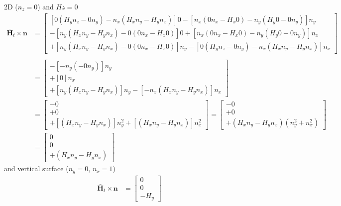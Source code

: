 \documentclass{article}
\newcommand{\Hb}{\mathbf{\bar H}}
\newcommand{\n}{\mathbf{n}}
\newcommand{\0}{\varnothing}
\begin{document}
2D ($n_z = 0$) and $Hz = 0$ 
\begin{align*}
    \Hb_t \times \n &=  \left[
    \begin{array}{c}
    [0 (H_y n_z - 0 n_y) - n_x (H_x n_y - H_y n_x)] 0 - [n_x (0 n_x - H_x 0) - n_y (H_y 0 - 0 n_y)] n_y\\
    -[n_y (H_x n_y - H_y n_x) - 0 (0 n_x - H_x 0)] 0 + [n_x (0 n_x - H_x 0) - n_y (H_y 0 - 0 n_y)]n_x\\
    +[n_y (H_x n_y - H_y n_x) - 0 (0 n_x - H_x 0)] n_y - [0 (H_y n_z - 0 n_y) - n_x (H_x n_y - H_y n_x)]n_x
    \end{array} \right]\\\\
    &=  \left[
    \begin{array}{c}
     - [ - n_y ( - 0 n_y)] n_y\\
     + [0] n_x\\
    +[n_y (H_x n_y - H_y n_x)] n_y - [ - n_x (H_x n_y - H_y n_x)]n_x
    \end{array} \right]\\    
    &=  \left[
    \begin{array}{c}
     - 0\\
     + 0\\
    +[(H_x n_y - H_y n_x)] n^2_y + [(H_x n_y - H_y n_x)]n^2_x
    \end{array} \right] = \left[
    \begin{array}{c}
     - 0\\
     + 0\\
    +(H_x n_y - H_y n_x)(n^2_y+ n^2_x)
    \end{array} \right]\\
    &=  \left[
    \begin{array}{c}
     0\\
     0\\
    +(H_x n_y - H_y n_x)
    \end{array} \right]
\end{align*}
and vertical surface ($n_y = 0$, $n_x = 1$)
\begin{align*}
    \Hb_t \times \n &=  \left[
    \begin{array}{c}
     0\\
     0\\
    - H_y
    \end{array} \right]
\end{align*}
\end{document}
